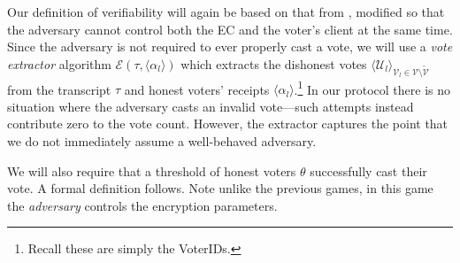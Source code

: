 \documentclass[12pt,a4paper]{article}
\theoremstyle{definition}
\begin{document}
Our definition of verifiability will again be based on that from \cite{kiayias2015end}, modified so that the adversary cannot control both the EC and the voter's client at the same time. Since the adversary is not required to ever properly cast a vote, we will use a \textit{vote extractor} algorithm $\mathcal{E}\left(\tau, \langle \alpha_l \rangle\right)$ which extracts the dishonest votes $\langle \mathcal{U}_l \rangle_{\mathcal{V}_l\in\mathcal{V}\setminus\tilde{\mathcal{V}}}$ from the transcript $\tau$ and honest voters' receipts $\langle \alpha_l \rangle$.\footnote{Recall these are simply the VoterIDs.} In our protocol there is no situation where the adversary casts an invalid vote---such attempts instead contribute zero to the vote count. However, the extractor captures the point that we do not immediately assume a well-behaved adversary.

We will also require that a threshold of honest voters $\theta$ successfully cast their vote. A formal definition follows. Note unlike the previous games, in this game the \textit{adversary} controls the encryption parameters.
\end{document}
